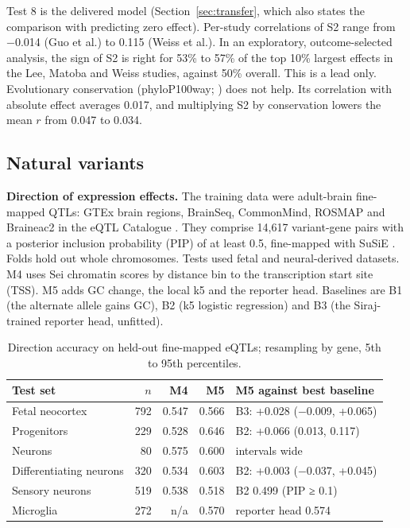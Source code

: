 \documentclass[10.5pt,a4paper]{article}
\begin{document}
Test 8 is the delivered model (Section~\ref{sec:transfer}, which also states the comparison with predicting zero effect). Per-study correlations of S2 range from −0.014 (Guo et al.) to 0.115 (Weiss et al.). In an exploratory, outcome-selected analysis, the sign of S2 is right for 53\% to 57\% of the top 10\% largest effects in the Lee, Matoba and Weiss studies, against 50\% overall. This is a lead only. Evolutionary conservation (phyloP100way; \citealt{pollard2010}) does not help. Its correlation with absolute effect averages 0.017, and multiplying S2 by conservation lowers the mean $r$ from 0.047 to 0.034.

\subsection{Natural variants}

\textbf{Direction of expression effects.} The training data were adult-brain fine-mapped QTLs: GTEx brain regions, BrainSeq, CommonMind, ROSMAP and Braineac2 in the eQTL Catalogue \citep{gtex2020,jaffe2018,fromer2016,ng2017,ramasamy2014,kerimov2021}. They comprise 14,617 variant-gene pairs with a posterior inclusion probability (PIP) of at least 0.5, fine-mapped with SuSiE \citep{wang2020}. Folds hold out whole chromosomes. Tests used fetal and neural-derived datasets. M4 uses Sei chromatin scores by distance bin to the transcription start site (TSS). M5 adds GC change, the local k5 and the reporter head. Baselines are B1 (the alternate allele gains GC), B2 (k5 logistic regression) and B3 (the Siraj-trained reporter head, unfitted).

\begin{table}[tb]
\small
\caption{Direction accuracy on held-out fine-mapped eQTLs; resampling by gene, 5th to 95th percentiles.}\label{tab:direction}
\begin{tabular}{@{}L{54mm}r r r L{42mm}@{}}
\toprule
Test set & $n$ & M4 & M5 & M5 against best baseline \\
\midrule
Fetal neocortex \citep{walker2019} & 792 & 0.547 & 0.566 & B3: +0.028 (−0.009, +0.065) \\
Progenitors \citep{aygun2021} & 229 & 0.528 & 0.646 & B2: +0.066 (0.013, 0.117) \\
Neurons \citep{aygun2021} & 80 & 0.575 & 0.600 & intervals wide \\
Differentiating neurons \citep{jerber2021} & 320 & 0.534 & 0.603 & B2: +0.003 (−0.037, +0.045) \\
Sensory neurons \citep{schwartzentruber2018} & 519 & 0.538 & 0.518 & B2 0.499 (PIP ≥ 0.1) \\
Microglia \citep{young2021} & 272 & n/a & 0.570 & reporter head 0.574 \\
\bottomrule
\end{tabular}
\end{table}
\end{document}
